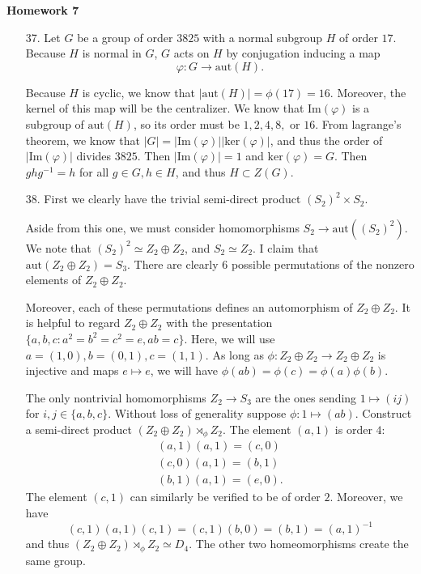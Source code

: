 \documentclass[12pt, reqno]{article}
\theoremstyle{plain}
\theoremstyle{definition}
\theoremstyle{remark}
\begin{document}
\topmargin=-40pt
\renewcommand{\headrulewidth}{1pt}
\renewcommand{\headsep}{20pt}
\thispagestyle{fancy}

{\Huge \bfseries \noindent Homework 7}

\begin{enumerate}
    \item[37.] Let $G$ be a group of order $3825$ with a normal subgroup $H$ of order $17$. 
    Because $H$ is normal in $G$, $G$ acts on $H$ by conjugation inducing a map
    \[
        \varphi: G \rightarrow \text{aut}(H).
    \]

    Because $H$ is cyclic, we know that $|\text{aut}(H)| = \phi(17) = 16$. Moreover, the 
    kernel of this map will be the centralizer. We know that $\text{Im}(\varphi)$ is 
    a subgroup of $\text{aut}(H)$, so its order must be $1, 2, 4, 8,$ or $16$.
    From lagrange's theorem, we know that $|G| = |\text{Im}(\varphi)||\text{ker}(\varphi)|$, 
    and thus the order of $|\text{Im}(\varphi)|$ divides $3825$. Then $|\text{Im}(\varphi)| = 1$
    and $\text{ker}(\varphi) = G$. Then $ghg^{-1} = h$ for all $g \in G, h \in H$, and thus $H \subset Z(G)$.

    \item[38.] First we clearly have the trivial semi-direct product $(S_2)^2 \times S_2$. 
    
    Aside from this one, we must consider homomorphisms $S_2 \rightarrow \text{aut}((S_2)^2)$. We note that
    $(S_2)^2 \simeq Z_2 \oplus Z_2$, and $S_2 \simeq Z_2$. I claim that $\text{aut}(Z_2 \oplus Z_2) = S_3$. There are clearly $6$ possible
    permutations of the nonzero elements of $Z_2 \oplus Z_2$. 
    
    Moreover, each of these permutations defines an 
    automorphism of $Z_2 \oplus Z_2$. It is helpful to regard $Z_2 \oplus Z_2$ with the presentation 
    $\{a, b, c: a^2 = b^2 = c^2 = e, ab = c\}$. Here, we will use $a = (1,0), b = (0,1), c = (1,1)$. 
    As long as $\phi: Z_2 \oplus Z_2 \rightarrow Z_2 \oplus Z_2$ is injective 
    and maps $e \mapsto e$, we will have $\phi(ab) = \phi(c) = \phi(a)\phi(b)$. 

    The only nontrivial homomorphisms $Z_2 \rightarrow S_3$ are the ones sending $1 \mapsto (ij)$ for $i,j \in \{a,b,c\}$.
    Without loss of generality suppose $\phi: 1 \mapsto (ab)$. Construct a semi-direct product 
    $(Z_2 \oplus Z_2) \rtimes_\phi Z_2$. The element $(a, 1)$ is order $4$: 
    \begin{align}
        (a, 1)(a, 1) = (c, 0)\\
        (c, 0)(a, 1) = (b, 1)\\
        (b, 1)(a, 1) = (e, 0).
    \end{align}
    The element $(c, 1)$ can similarly be verified to be of order $2$. Moreover, we have
    \[
        (c,1)(a,1)(c,1) = (c,1)(b, 0) = (b, 1) = (a,1)^{-1}
    \]
    and thus $(Z_2 \oplus Z_2) \rtimes_\phi Z_2 \simeq D_4$. The other two homeomorphisms create the same group.


\end{enumerate}
\end{document}
